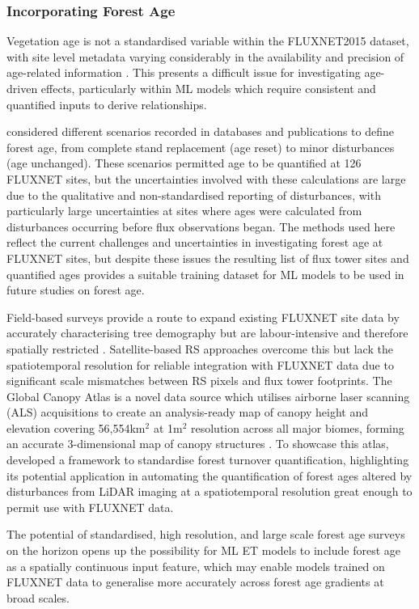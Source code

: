 \documentclass[paper=a4,fontsize=12pt]{scrartcl}
\begin{document}
\subsubsection{Incorporating Forest Age} 
Vegetation age is not a standardised variable within the FLUXNET2015 dataset, with site level metadata varying considerably in the availability and precision of age-related information \parencite{pastorello2020fluxnet2015}. This presents a difficult issue for investigating age-driven effects, particularly within ML models which require consistent and quantified inputs to derive relationships. 
\par \textcite{besnard2018quantifying} considered different scenarios recorded in databases and publications to define forest age, from complete stand replacement (age reset) to minor disturbances (age unchanged). These scenarios permitted age to be quantified at 126 FLUXNET sites, but the uncertainties involved with these calculations are large due to the qualitative and non-standardised reporting of disturbances, with particularly large uncertainties at sites where ages were calculated from disturbances occurring before flux observations began. The methods used here reflect the current challenges and uncertainties in investigating forest age at FLUXNET sites, but despite these issues the resulting list of flux tower sites and quantified ages provides a suitable training dataset for ML models to be used in future studies on forest age.
\par Field-based surveys provide a route to expand existing FLUXNET site data by accurately characterising tree demography but are labour-intensive and therefore spatially restricted \parencite{battison2024tracking}. Satellite-based RS approaches overcome this but lack the spatiotemporal resolution for reliable integration with FLUXNET data due to significant scale mismatches between RS pixels and flux tower footprints. The Global Canopy Atlas is a novel data source which utilises airborne laser scanning (ALS) acquisitions to create an analysis-ready map of canopy height and elevation covering 56,554km$^2$ at 1m$^2$ resolution across all major biomes, forming an accurate 3-dimensional map of canopy structures \parencite{fischer2025global}. To showcase this atlas, \textcite{fischer2025global} developed a framework to standardise forest turnover quantification, highlighting its potential application in automating the quantification of forest ages altered by disturbances from LiDAR imaging at a spatiotemporal resolution great enough to permit use with FLUXNET data.
\par The potential of standardised, high resolution, and large scale forest age surveys on the horizon opens up the possibility for ML ET models to include forest age as a spatially continuous input feature, which may enable models trained on FLUXNET data to generalise more accurately across forest age gradients at broad scales. 
\end{document}

